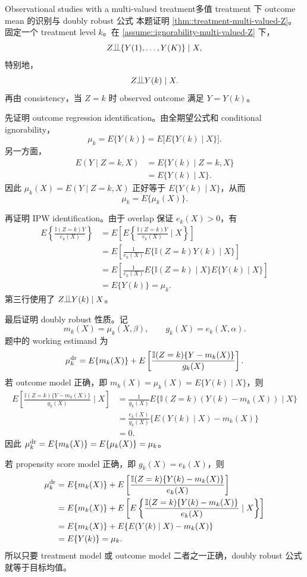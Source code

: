 \begin{exercisesolution}{Observational studies with a multi-valued treatment}{多值 treatment 下 outcome mean 的识别与 doubly robust 公式}
本题证明 \cref{thm::treatment-multi-valued-Z}。固定一个 treatment level $k$。在 \cref{assume::ignorability-multi-valued-Z} 下，
\[
Z\ind \{Y(1),\ldots,Y(K)\}\mid X,
\]
特别地，
\[
Z\ind Y(k)\mid X.
\]
再由 consistency，当 $Z=k$ 时 observed outcome 满足 $Y=Y(k)$。

先证明 outcome regression identification。由全期望公式和 conditional ignorability，
\[
\mu_k
=
E\{Y(k)\}
=
E\bigl[E\{Y(k)\mid X\}\bigr].
\]
另一方面，
\begin{align*}
E(Y\mid Z=k,X)
&=
E\{Y(k)\mid Z=k,X\}\\
&=
E\{Y(k)\mid X\}.
\end{align*}
因此 $\mu_k(X)=E(Y\mid Z=k,X)$ 正好等于 $E\{Y(k)\mid X\}$，从而
\[
\mu_k=E\{\mu_k(X)\}.
\]

再证明 IPW identification。由于 overlap 保证 $e_k(X)>0$，有
\begin{align*}
E\left\{\frac{\mathbb{I}(Z=k)Y}{e_k(X)}\right\}
&=
E\left[
E\left\{\frac{\mathbb{I}(Z=k)Y}{e_k(X)}\mid X\right\}
\right]\\
&=
E\left[
\frac{1}{e_k(X)}
E\{\mathbb{I}(Z=k)Y(k)\mid X\}
\right]\\
&=
E\left[
\frac{1}{e_k(X)}
E\{\mathbb{I}(Z=k)\mid X\}
E\{Y(k)\mid X\}
\right]\\
&=
E\{Y(k)\}
=
\mu_k.
\end{align*}
第三行使用了 $Z\ind Y(k)\mid X$。

最后证明 doubly robust 性质。记
\[
m_k(X)=\mu_k(X,\beta),
\qquad
g_k(X)=e_k(X,\alpha).
\]
题中的 working estimand 为
\[
\mu_k^{\textup{dr}}
=
E\{m_k(X)\}
+
E\left[
\frac{\mathbb{I}(Z=k)\{Y-m_k(X)\}}{g_k(X)}
\right].
\]
若 outcome model 正确，即 $m_k(X)=\mu_k(X)=E\{Y(k)\mid X\}$，则
\begin{align*}
E\left[
\frac{\mathbb{I}(Z=k)\{Y-m_k(X)\}}{g_k(X)}
\mid X
\right]
&=
\frac{1}{g_k(X)}
E\{\mathbb{I}(Z=k)(Y(k)-m_k(X))\mid X\}\\
&=
\frac{e_k(X)}{g_k(X)}
\{E(Y(k)\mid X)-m_k(X)\}\\
&=0.
\end{align*}
因此 $\mu_k^{\textup{dr}}=E\{m_k(X)\}=E\{\mu_k(X)\}=\mu_k$。

若 propensity score model 正确，即 $g_k(X)=e_k(X)$，则
\begin{align*}
\mu_k^{\textup{dr}}
&=
E\{m_k(X)\}
+
E\left[
\frac{\mathbb{I}(Z=k)\{Y(k)-m_k(X)\}}{e_k(X)}
\right]\\
&=
E\{m_k(X)\}
+
E\left[
E\left\{
\frac{\mathbb{I}(Z=k)\{Y(k)-m_k(X)\}}{e_k(X)}
\mid X
\right\}
\right]\\
&=
E\{m_k(X)\}
+
E\{E(Y(k)\mid X)-m_k(X)\}\\
&=
E\{Y(k)\}
=
\mu_k.
\end{align*}
所以只要 treatment model 或 outcome model 二者之一正确，doubly robust 公式就等于目标均值。


\end{exercisesolution}
